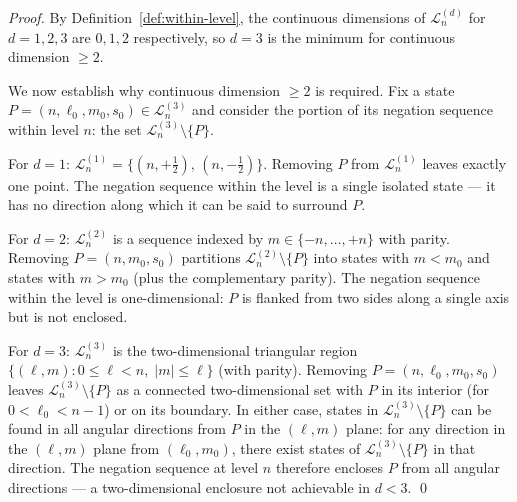\documentclass[twocolumn,10pt,a4paper]{article}
\theoremstyle{thmstyle}
\theoremstyle{definition}
\theoremstyle{remark}
\begin{document}
\begin{proof}
By Definition~\ref{def:within-level}, the continuous dimensions of $\mathcal{L}_n^{(d)}$ for $d = 1, 2, 3$ are $0, 1, 2$ respectively, so $d = 3$ is the minimum for continuous dimension $\geq 2$.

We now establish why continuous dimension $\geq 2$ is required. Fix a state $P = (n, \ell_0, m_0, s_0) \in \mathcal{L}_n^{(3)}$ and consider the portion of its negation sequence within level $n$: the set $\mathcal{L}_n^{(3)} \setminus \{P\}$.

For $d = 1$: $\mathcal{L}_n^{(1)} = \{(n,+\tfrac{1}{2}),\, (n,-\tfrac{1}{2})\}$. Removing $P$ from $\mathcal{L}_n^{(1)}$ leaves exactly one point. The negation sequence within the level is a single isolated state --- it has no direction along which it can be said to surround $P$.

For $d = 2$: $\mathcal{L}_n^{(2)}$ is a sequence indexed by $m \in \{-n,\ldots,+n\}$ with parity. Removing $P = (n, m_0, s_0)$ partitions $\mathcal{L}_n^{(2)} \setminus \{P\}$ into states with $m < m_0$ and states with $m > m_0$ (plus the complementary parity). The negation sequence within the level is one-dimensional: $P$ is flanked from two sides along a single axis but is not enclosed.

For $d = 3$: $\mathcal{L}_n^{(3)}$ is the two-dimensional triangular region $\{(\ell, m) : 0 \leq \ell < n,\; |m| \leq \ell\}$ (with parity). Removing $P = (n, \ell_0, m_0, s_0)$ leaves $\mathcal{L}_n^{(3)} \setminus \{P\}$ as a connected two-dimensional set with $P$ in its interior (for $0 < \ell_0 < n-1$) or on its boundary. In either case, states in $\mathcal{L}_n^{(3)} \setminus \{P\}$ can be found in all angular directions from $P$ in the $(\ell, m)$ plane: for any direction in the $(\ell, m)$ plane from $(\ell_0, m_0)$, there exist states of $\mathcal{L}_n^{(3)} \setminus \{P\}$ in that direction. The negation sequence at level $n$ therefore encloses $P$ from all angular directions --- a two-dimensional enclosure not achievable in $d < 3$. \qed
\end{proof}
\end{document}
